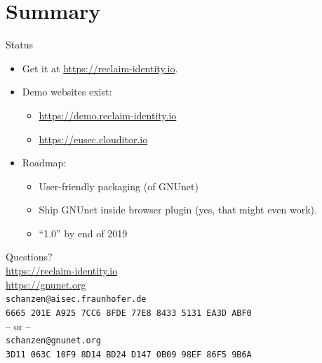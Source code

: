 \documentclass[aspectratio=169]{beamer}
\begin{document}
\section{Summary}

\begin{frame}{Status}
  \begin{itemize}
    \item Get it at \url{https://reclaim-identity.io}.
    \item Demo websites exist:
      \begin{itemize}
        \item \url{https://demo.reclaim-identity.io}
        \item \url{https://eusec.clouditor.io}
      \end{itemize}
    \item Roadmap:
      \begin{itemize}
        \item User-friendly packaging (of GNUnet)
        \item Ship GNUnet inside browser plugin (yes, that might even work).
        \item ``1.0'' by end of 2019
      \end{itemize}
  \end{itemize}
  \begin{center}
      \end{center}
\end{frame}


\begin{frame}
  \begin{center}
    Questions?\\
    \vspace{2cm}
    \url{https://reclaim-identity.io}\\
    \url{https://gnunet.org}\\
    \vspace{1em}
    {\tiny
    \texttt{schanzen@aisec.fraunhofer.de}\\
    \texttt{6665~201E~A925~7CC6~8FDE~77E8~8433~5131~EA3D~ABF0}\\
    -- or --\\
    \texttt{schanzen@gnunet.org}\\
    \texttt{3D11~063C~10F9~8D14~BD24~D147~0B09~98EF~86F5~9B6A}\\
    }
  \end{center}
\end{frame}

\appendix
\end{document}
